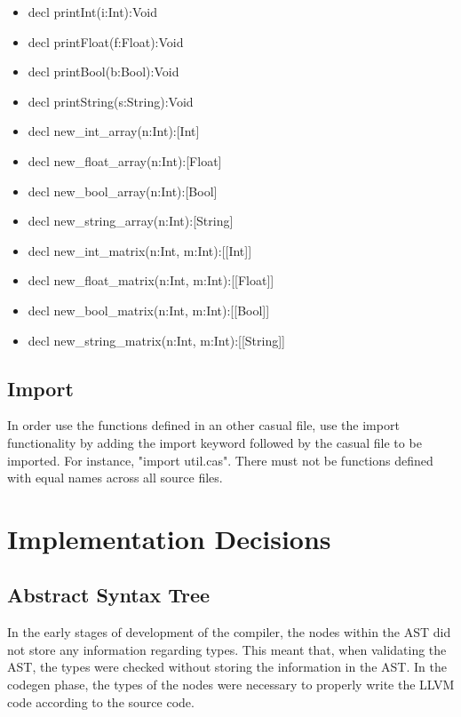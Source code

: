 \documentclass[12pt]{article}
\begin{document}
\begin{itemize}
		\item decl printInt(i:Int):Void
        \item decl printFloat(f:Float):Void
        \item decl printBool(b:Bool):Void
        \item decl printString(s:String):Void
        \item decl new\_int\_array(n:Int):[Int]
        \item decl new\_float\_array(n:Int):[Float]
        \item decl new\_bool\_array(n:Int):[Bool]
        \item decl new\_string\_array(n:Int):[String]
        \item decl new\_int\_matrix(n:Int, m:Int):[[Int]]
        \item decl new\_float\_matrix(n:Int, m:Int):[[Float]]
        \item decl new\_bool\_matrix(n:Int, m:Int):[[Bool]]
        \item decl new\_string\_matrix(n:Int, m:Int):[[String]]       

\end{itemize}

\subsection{Import}
In order use the functions defined in an other casual file, use the import functionality by adding the import keyword followed by the casual file to be imported. For instance, "import util.cas". There must not be functions defined with equal names across all source files.

\newpage


\section{Implementation Decisions}
\subsection{Abstract Syntax Tree}
In the early stages of development of the compiler, the nodes within the AST did not store any information regarding types. This meant that, when validating the AST, the types were checked without storing the information in the AST. In the codegen phase, the types of the nodes were necessary to properly write the LLVM code according to the source code.
\end{document}
